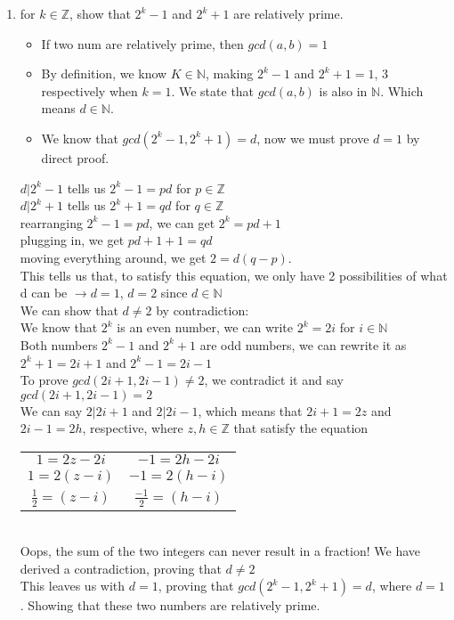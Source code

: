 \documentclass{article}
\begin{document}
  \begin{enumerate}[label=\textbf{10.32}]
    \item for $k \in \mathbb{Z}$, show that $2^k - 1$ and $2^k + 1$ are relatively prime.
    
    \begin{itemize}
      \item If two num are relatively prime, then $gcd(a,b) = 1$
      \item By definition, we know $K \in \mathbb{N}$, making $2^k-1$ and $2^k+1 =1$, $3$ respectively when $k=1$. We state that $gcd(a,b)$ is also in $\mathbb{N}$. Which means $d \in \mathbb{N}$.
      \item We know that $gcd(2^k-1, 2^k+1) = d$, now we must prove $d=1$ by direct proof.
    \end{itemize}

    $d|2^k-1$ tells us $2^k-1 = pd$ for $p\in\mathbb{Z}$\\
    $d|2^k+1$ tells us $2^k+1 = qd$ for $q\in\mathbb{Z}$\\
    rearranging $2^k - 1 = pd$, we can get $2^k = pd + 1$\\
    plugging in, we get $pd + 1 + 1 = qd$\\
    moving everything around, we get $2 = d(q-p)$.\\
    This tells us that, to satisfy this equation, we only have 2 possibilities of what d can be $\rightarrow d= 1$, $d=2$ since $d\in\mathbb{N}$\\[0.25in]
    We can show that $d\neq 2$ by contradiction:\\
    We know that $2^k$ is an even number, we can write $2^k = 2i$ for $i \in \mathbb{N}$\\
    Both numbers $2^k - 1$ and $2^k+1$ are odd numbers, we can rewrite it as $2^k + 1 = 2i + 1$ and $2^k - 1 = 2i-1$\\
    To prove $gcd(2i + 1, 2i - 1) \neq 2$, we contradict it and say $gcd(2i+1, 2i-1)=2$\\
    We can say $2|2i+1$ and $2|2i-1$, which means that $2i + 1 = 2z$ and $2i - 1 = 2h$, respective, where $z,h\in \mathbb{Z}$ that satisfy the equation\\
    \begin{tabular}{c | c}
      $1 = 2z-2i$ & $-1 = 2h - 2i$\\
      $1 = 2(z-i)$ & $-1 = 2(h-i)$\\
      $\frac{1}{2} = (z-i)$ & $\frac{-1}{2} = (h-i)$
    \end{tabular}\\
    Oops, the sum of the two integers can never result in a fraction! We have derived a contradiction, proving that $d \neq 2$\\
    This leaves us with $d=1$, proving that $gcd(2^k-1,2^k+1) = d$, where $d=1$. Showing that these two numbers are relatively prime.
  \end{enumerate}
\end{document}
